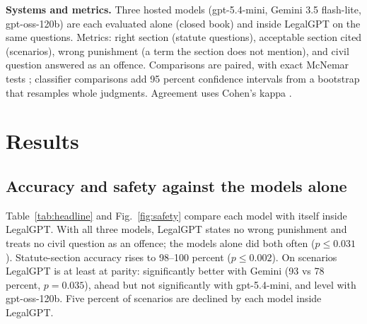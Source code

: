 \documentclass[conference]{IEEEtran}
\begin{document}
\textbf{Systems and metrics.} Three hosted models (gpt-5.4-mini, Gemini 3.5 flash-lite, gpt-oss-120b)
are each evaluated alone (closed book) and inside LegalGPT on the same questions. Metrics: right
section (statute questions), acceptable section cited (scenarios), wrong punishment (a term the
section does not mention), and civil question answered as an offence. Comparisons are paired, with
exact McNemar tests \cite{mcnemar1947}; classifier comparisons add 95 percent confidence intervals
from a bootstrap \cite{efron1993bootstrap} that resamples whole judgments. Agreement uses Cohen's
kappa \cite{cohen1960kappa}.

\section{Results}\label{sec:results}

\subsection{Accuracy and safety against the models alone}

Table~\ref{tab:headline} and Fig.~\ref{fig:safety} compare each model with itself inside LegalGPT.
With all three models, LegalGPT states no wrong punishment and treats no civil question as an
offence; the models alone did both often ($p \le 0.031$). Statute-section accuracy rises to 98--100
percent ($p \le 0.002$). On scenarios LegalGPT is at least at parity: significantly better with
Gemini (93 vs 78 percent, $p=0.035$), ahead but not significantly with gpt-5.4-mini, and level with
gpt-oss-120b. Five percent of scenarios are declined by each model inside LegalGPT.
\end{document}

